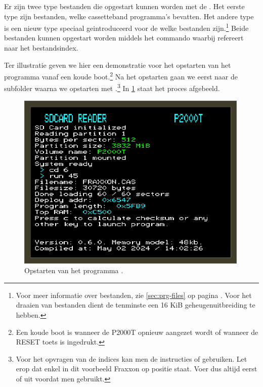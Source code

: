 Er zijn twee type bestanden die opgestart kunnen worden met de \product. Het eerste type zijn \cas bestanden, welke cassetteband programma's bevatten. Het andere type is een nieuw type speciaal geintroduceerd voor de \product welke \prg bestanden zijn.\footnote{Voor meer informatie over \prg bestanden, zie \cref{sec:prg-files} op pagina \pageref{sec:prg-files}. Voor het draaien van \prg bestanden dient de  tenminste een 16 KiB geheugenuitbreiding te hebben.} Beide bestanden kunnen opgestart worden middels het  commando waarbij  refereert naar het bestandsindex.

Ter illustratie geven we hier een demonstratie voor het opstarten van het programma  vanaf een koude boot.\footnote{Een koude boot is wanneer de P2000T opnieuw aangezet wordt of wanneer de RESET toets is ingedrukt.} Na het opstarten gaan we eerst naar de subfolder  waarna we  opstarten met .\footnote{Voor het opvragen van de indices kan men de instructies  of  gebruiken. Let erop dat enkel in dit voorbeeld Fraxxon op positie  staat. Voer dus altijd eerst  of  uit voordat men  gebruikt.} In \cref{fig:screenshot-run-fraxon} staat het proces afgebeeld.

\begin{figure}[h!]
    \centering
    \includegraphics[width=0.99\textwidth]{img/run-fraxxon.png}
    \caption{Opstarten van het programma .}
    \label{fig:screenshot-run-fraxon}
\end{figure}

